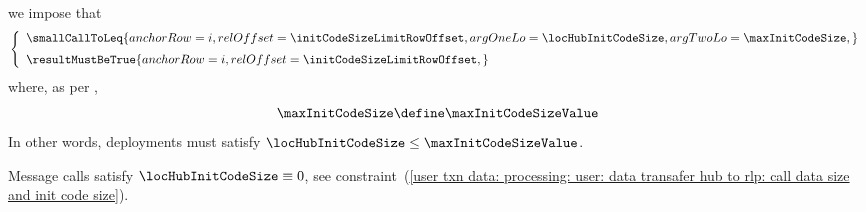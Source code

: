 \item[\underline{\underline{Row n$°(i + \initCodeSizeLimitRowOffset )$: \cite{EIP-3860} mandated init code size check:}}]
	we impose that
	\[
		\left\{\begin{array}{l}
			\smallCallToLeq {
				anchorRow = i                           ,
				relOffset = \initCodeSizeLimitRowOffset ,
				argOneLo  = \locHubInitCodeSize         ,
				argTwoLo  = \maxInitCodeSize            ,
			}
			\vspace{2mm}
			\\
			\resultMustBeTrue {
				anchorRow = i                           ,
				relOffset = \initCodeSizeLimitRowOffset ,
			}
			\\
		\end{array}\right.
	\]
	where, as per \cite{EIP-3860},
	\[
		\maxInitCodeSize \define \maxInitCodeSizeValue
	\]
	In other words, deployments must satisfy $\locHubInitCodeSize \leq \maxInitCodeSizeValue$.

	\saNote{} \label{user txn data: processing: user: common computations: max init code size check}
	Message calls satisfy $\locHubInitCodeSize \equiv 0$,
	see constraint~(\ref{user txn data: processing: user: data transafer hub to rlp: call data size and init code size}).
